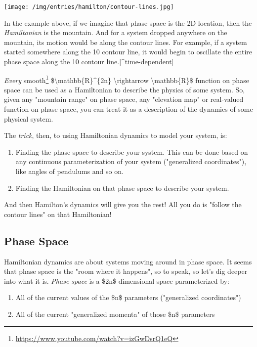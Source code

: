 \documentclass[]{article}
\renewcommand{\href}[2]{#2\footnote{\url{#1}}}
\begin{document}
\texttt{[image: /img/entries/hamilton/contour-lines.jpg]}

In the example above, if we imagine that phase space is the 2D location, then
the \emph{Hamiltonian} is the mountain. And for a system dropped anywhere on the
mountain, its motion would be along the contour lines. For example, if a system
started somewhere along the 10 contour line, it would begin to oscillate the
entire phase space along the 10 contour line.{[}\^{}time-dependent{]}

\emph{Every} \href{https://www.youtube.com/watch?v=izGwDsrQ1eQ}{smooth}
\$\textbackslash{}mathbb\{R\}\^{}\{2n\} \textbackslash{}rightarrow
\textbackslash{}mathbb\{R\}\$ function on phase space can be used as a
Hamiltonian to describe the physics of some system. So, given any "mountain
range" on phase space, any "elevation map" or real-valued function on phase
space, you can treat it as a description of the dynamics of some physical
system.

The \emph{trick}, then, to using Hamiltonian dynamics to model your system, is:

\begin{enumerate}
\item
  Finding the phase space to describe your system. This can be done based on any
  continuous parameterization of your system ("generalized coordinates"), like
  angles of pendulums and so on.
\item
  Finding the Hamiltonian on that phase space to describe your system.
\end{enumerate}

And then Hamilton's dynamics will give you the rest! All you do is "follow the
contour lines" on that Hamiltonian!

\subsection{Phase Space}

Hamiltonian dynamics are about systems moving around in phase space. It seems
that phase space is the "room where it happens", so to speak, so let's dig
deeper into what it is. \emph{Phase space} is a \$2n\$-dimensional space
parameterized by:

\begin{enumerate}
\tightlist
\item
  All of the current values of the \$n\$ parameters ("generalized coordinates")
\item
  All of the current "generalized momenta" of those \$n\$ parameters
\end{enumerate}
\end{document}
